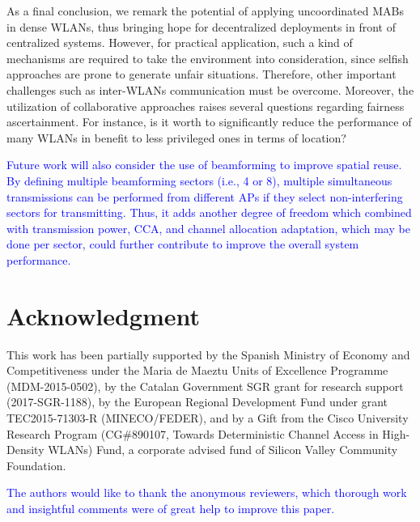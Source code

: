 \documentclass[preprint,12pt]{elsarticle}
\begin{document}
As a final conclusion, we remark the potential of applying uncoordinated MABs in dense WLANs, thus bringing hope for decentralized deployments in front of centralized systems. However, for practical application, such a kind of mechanisms are required to take the environment into consideration, since selfish approaches are prone to generate unfair situations. Therefore, other important challenges such as inter-WLANs communication must be overcome. Moreover, the utilization of collaborative approaches raises several questions regarding fairness ascertainment. For instance, is it worth to significantly reduce the performance of many WLANs in benefit to less privileged ones in terms of location?

\textcolor{blue}{Future work will also consider the use of beamforming to improve spatial reuse. By defining multiple beamforming sectors (i.e., 4 or 8), multiple simultaneous transmissions can be performed from different APs if they select non-interfering sectors for transmitting. Thus, it adds another degree of freedom which combined with transmission power, CCA, and channel allocation adaptation, which may be done per sector, could further contribute to improve the overall system performance.}

\section*{Acknowledgment}
This work has been partially supported by the Spanish Ministry of Economy and Competitiveness under the Maria de Maeztu Units of Excellence Programme (MDM-2015-0502), by the Catalan Government SGR grant for research support (2017-SGR-1188), by the European Regional Development Fund under grant TEC2015-71303-R (MINECO/FEDER), and by a Gift from the Cisco University Research Program (CG\#890107, Towards Deterministic Channel Access in High-Density WLANs) Fund, a corporate advised fund of Silicon Valley Community Foundation.

\textcolor{blue}{The authors would like to thank the anonymous reviewers, which thorough work and insightful comments were of great help to improve this paper.}
\end{document}

